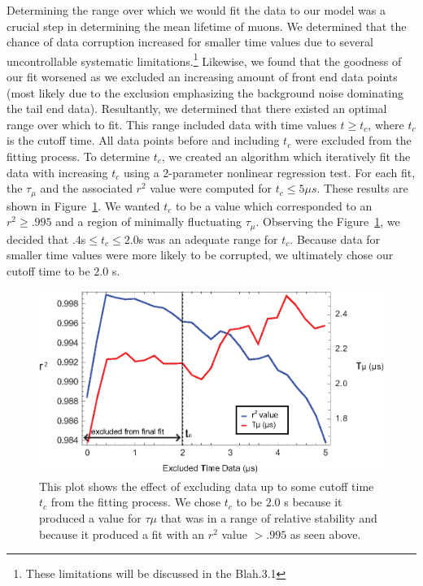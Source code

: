 Determining the range over which we would fit the data to our model
was a crucial step in determining the mean lifetime of muons.  We
determined that the chance of data corruption increased for smaller
time values due to several uncontrollable systematic
limitations.\footnote{These limitations will be discussed in the
Blah.3.1} Likewise, we found that the goodness of our fit worsened as
we excluded an increasing amount of front end data points (most likely
due to the exclusion emphasizing the background noise dominating the
tail end data).  Resultantly, we determined that there existed an
optimal range over which to fit.  This range included data with time
values $t \geq t_{c}$, where $t_{c}$ is the cutoff time.  All data
points before and including $t_{c}$ were excluded from the fitting
process.  To determine $t_{c}$, we created an algorithm which
iteratively fit the data with increasing $t_{c}$ using a 2-parameter
nonlinear regression test.  For each fit, the $\tau_{\mu}$ and the
associated $r^{2}$ value were computed for $t_{c}\leq 5\mu s$.  These
results are shown in Figure~\ref{fig:rsq}.  We wanted $t_{c}$ to be a
value which corresponded to an $r^{2} \geq .995$ and a region of
minimally fluctuating $\tau_{\mu}$.  Observing the Figure~\ref{fig:rsq}, we decided
that $.4$\mu s$ \leq t_{c}\leq 2.0$\mu s was an adequate range for $t_{c}$.
Because data for smaller time values were more likely to be corrupted,
we ultimately chose our cutoff time to be $2.0$ \mu s.


\begin{figure}[htbp]
\begin{center}
\includegraphics[height=60mm]{./figures/lifetime_fit_param.eps}
\caption{This plot shows the effect of excluding data up to some cutoff time $t_{c}$ from the fitting process.  We chose $t_{c}$ to be $2.0$ \mu s because it produced a value for $\tau{\mu}$ that was in a range of relative stability and because it produced a fit with an $r^{2}$ value $> .995$ as seen above.}
\label{fig:rsq}
\end{center}
\end{figure}

